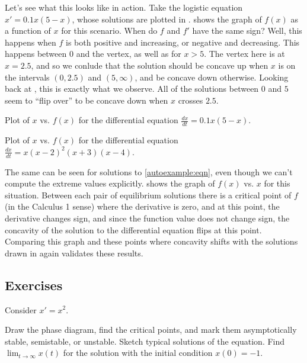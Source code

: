 Let's see what this looks like in action. Take the logistic equation $x' = 0.1x(5-x)$, whose solutions are plotted in .  shows the graph of $f(x)$ as a function of $x$ for this scenario. When do $f$ and $f'$ have the same sign? Well, this happens when $f$ is both positive and increasing, or negative and decreasing. This happens between $0$ and the vertex, as well as for $x> 5$. The vertex here is at $x=2.5$, and so we conlude that the solution should be concave up when $x$ is on the intervals $(0, 2.5)$ and $(5, \infty)$, and be concave down otherwise. Looking back at , this is exactly what we observe. All of the solutions between $0$ and $5$ seem to ``flip over'' to be concave down when $x$ crosses $2.5$.   

\begin{myfig}
\parbox[t]{3.0in}{
 \capstart
 \caption{Plot of $x$ vs. $f(x)$ for the differential equation $\frac{dx}{dt} = 0.1x(5-x)$.\label{autologfplot:fig}}
}
\quad
\parbox[t]{3.0in}{
 \capstart
 \caption{{Plot of $x$ vs. $f(x)$ for the differential equation $\frac{dx}{dt} = x(x-2)^2(x+3)(x-4)$.\label{autoexfplot:fig}}
} }
\end{myfig}

The same can be seen for solutions to \eqref{autoexample:eqn}, even though we can't compute the extreme values explicitly.  shows the graph of $f(x)$ vs. $x$ for this situation. Between each pair of equilibrium solutions there is a critical point of $f$ (in the Calculus 1 sense) where the derivative is zero, and at this point, the derivative changes sign, and since the function value does not change sign, the concavity of the solution to the differential equation flips at this point. Comparing this graph and these points where concavity shifts with the solutions drawn in  again validates these results.


\subsection{Exercises}

\begin{samepage}
\begin{exercise}
Consider $x' = x^2$.
\begin{tasks}
\task Draw the phase diagram,
find the critical points, and mark them asymptotically stable, semistable, or unstable.
\task Sketch typical solutions of the equation.
\task Find $\displaystyle \lim_{t\to \infty} x(t)$ for the solution with the initial condition
$x(0) = -1$.
\end{tasks}
\end{exercise}
\end{samepage}

